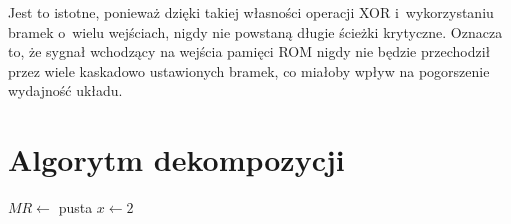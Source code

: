 Jest to istotne,
ponieważ dzięki takiej własności operacji XOR i~wykorzystaniu bramek o~wielu wejściach,
nigdy nie powstaną długie ścieżki krytyczne.
Oznacza to,
że sygnał wchodzący na wejścia pamięci ROM nigdy nie będzie przechodził przez wiele kaskadowo ustawionych bramek,
co miałoby wpływ na pogorszenie wydajność układu.

\section{Algorytm dekompozycji}
\label{section:decomposition-alorithm}

\begin{algorithm}[H]
    $MR\gets$ pusta\;
    $x\gets 2$\;
\end{algorithm}
%
%
%
